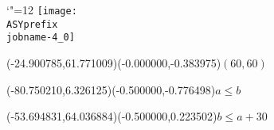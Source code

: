 \setlength{\unitlength}{1pt}%
\makeatletter%
\let\ASYencoding\f@encoding%
\let\ASYfamily\f@family%
\let\ASYseries\f@series%
\let\ASYshape\f@shape%
\makeatother%
{\catcode`"=12%
\texttt{[image: \\ASYprefix\\jobname-4\_0]}%
}%
%
\fontsize{6.000000}{7.200000}\selectfont%
\usefont{\ASYencoding}{\ASYfamily}{\ASYseries}{\ASYshape}%
\ASYalign(-24.900785,61.771009)(-0.000000,-0.383975){$(60,60)$}%
%
\fontsize{6.000000}{7.200000}\selectfont%
\ASYalign(-80.750210,6.326125)(-0.500000,-0.776498){$a\le b$}%
%
\fontsize{6.000000}{7.200000}\selectfont%
\ASYalign(-53.694831,64.036884)(-0.500000,0.223502){$b\le a+30$}%
